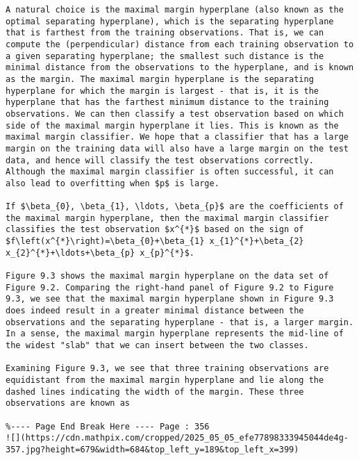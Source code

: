 \documentclass[10pt]{article}
\begin{document}
\begin{verbatim}
A natural choice is the maximal margin hyperplane (also known as the optimal separating hyperplane), which is the separating hyperplane that is farthest from the training observations. That is, we can compute the (perpendicular) distance from each training observation to a given separating hyperplane; the smallest such distance is the minimal distance from the observations to the hyperplane, and is known as the margin. The maximal margin hyperplane is the separating hyperplane for which the margin is largest - that is, it is the hyperplane that has the farthest minimum distance to the training observations. We can then classify a test observation based on which side of the maximal margin hyperplane it lies. This is known as the maximal margin classifier. We hope that a classifier that has a large margin on the training data will also have a large margin on the test data, and hence will classify the test observations correctly. Although the maximal margin classifier is often successful, it can also lead to overfitting when $p$ is large.

If $\beta_{0}, \beta_{1}, \ldots, \beta_{p}$ are the coefficients of the maximal margin hyperplane, then the maximal margin classifier classifies the test observation $x^{*}$ based on the sign of $f\left(x^{*}\right)=\beta_{0}+\beta_{1} x_{1}^{*}+\beta_{2} x_{2}^{*}+\ldots+\beta_{p} x_{p}^{*}$.

Figure 9.3 shows the maximal margin hyperplane on the data set of Figure 9.2. Comparing the right-hand panel of Figure 9.2 to Figure 9.3, we see that the maximal margin hyperplane shown in Figure 9.3 does indeed result in a greater minimal distance between the observations and the separating hyperplane - that is, a larger margin. In a sense, the maximal margin hyperplane represents the mid-line of the widest "slab" that we can insert between the two classes.

Examining Figure 9.3, we see that three training observations are equidistant from the maximal margin hyperplane and lie along the dashed lines indicating the width of the margin. These three observations are known as

%---- Page End Break Here ---- Page : 356
![](https://cdn.mathpix.com/cropped/2025_05_05_efe77898333945044de4g-357.jpg?height=679&width=684&top_left_y=189&top_left_x=399)


\end{verbatim}
\end{document}
